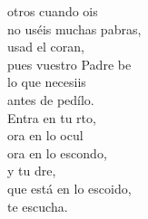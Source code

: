 \begin{cancion}%
	otros cuando ois \\
	no uséis muchas pabras,\\
	usad el coran,\\
	pues vuestro Padre be\\
	lo que necesiis \\
	antes de pedílo.\\
	Entra en tu rto,\\
	ora en lo ocul\\
	ora en lo escondo,\\
	y tu dre,\\
	que está en lo escoido,\\
	te escucha.\\
\end{cancion}%

